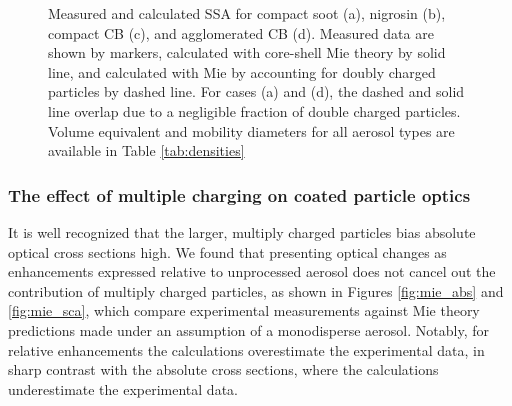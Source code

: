 \begin{figure}[htp]
{
    }
    \caption{Measured and calculated SSA for compact soot (a), nigrosin (b), compact CB (c), and agglomerated CB (d). Measured data are shown by markers, calculated with core-shell Mie theory  by solid line, and calculated with Mie by accounting for doubly charged particles by dashed line. For cases (a) and (d), the dashed and solid line overlap due to a negligible fraction of double charged particles. Volume equivalent and mobility diameters for all aerosol types are available in Table \ref{tab:densities}}
    \label{fig:ssa}
\end{figure}


\subsubsection{The effect of multiple charging on coated particle optics}

It is well recognized that the larger, multiply charged particles bias absolute optical cross sections high. We found that presenting optical changes as enhancements expressed relative to unprocessed aerosol does not cancel out the contribution of multiply charged particles, as shown in Figures \ref{fig:mie_abs} and \ref{fig:mie_sca}, which compare experimental measurements against Mie theory predictions made under an assumption of a monodisperse aerosol. Notably, for relative enhancements the calculations overestimate the experimental data, in sharp contrast with the absolute cross sections, where the calculations underestimate the experimental data.

